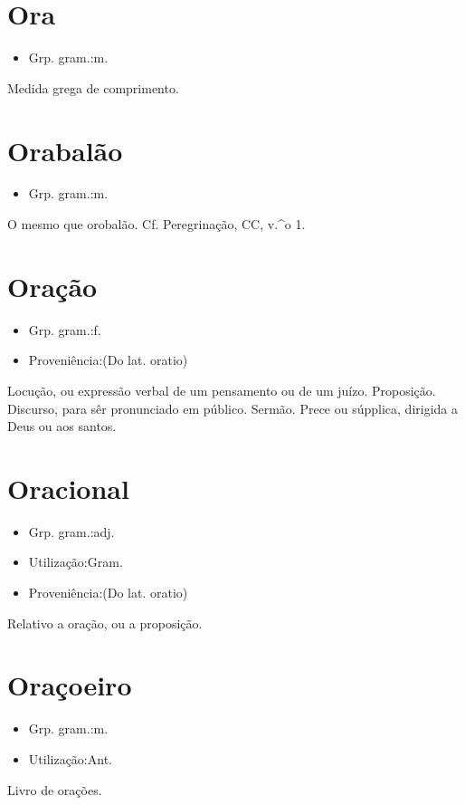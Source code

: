 \section{Ora}
\begin{itemize}
\item {Grp. gram.:m.}
\end{itemize}
Medida grega de comprimento.
\section{Orabalão}
\begin{itemize}
\item {Grp. gram.:m.}
\end{itemize}
O mesmo que \textunderscore orobalão\textunderscore . Cf. \textunderscore Peregrinação\textunderscore , CC, v.^o 1.
\section{Oração}
\begin{itemize}
\item {Grp. gram.:f.}
\end{itemize}
\begin{itemize}
\item {Proveniência:(Do lat. \textunderscore oratio\textunderscore )}
\end{itemize}
Locução, ou expressão verbal de um pensamento ou de um juízo.
Proposição.
Discurso, para sêr pronunciado em público.
Sermão.
Prece ou súpplica, dirigida a Deus ou aos santos.
\section{Oracional}
\begin{itemize}
\item {Grp. gram.:adj.}
\end{itemize}
\begin{itemize}
\item {Utilização:Gram.}
\end{itemize}
\begin{itemize}
\item {Proveniência:(Do lat. \textunderscore oratio\textunderscore )}
\end{itemize}
Relativo a oração, ou a proposição.
\section{Oraçoeiro}
\begin{itemize}
\item {Grp. gram.:m.}
\end{itemize}
\begin{itemize}
\item {Utilização:Ant.}
\end{itemize}
Livro de orações.
